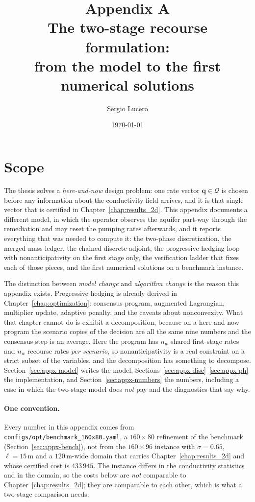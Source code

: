 \documentclass[11pt]{article}
\title{Appendix A\\
\large The two-stage recourse formulation:\\
from the model to the first numerical solutions}
\author{Sergio Lucero}
\date{\today}
\newcommand{\qq}{\mathbf{q}}
\newcommand{\calQ}{\mathcal{Q}}
\begin{document}
\maketitle

\section*{Scope}

The thesis solves a \emph{here-and-now} design problem: one rate vector
$\qq\in\calQ$ is chosen before any information about the conductivity field
arrives, and it is that single vector that is certified in
Chapter~\ref{chap:results_2d}. This appendix documents a different model, in
which the operator observes the aquifer part-way through the remediation and may
reset the pumping rates afterwards, and it reports everything that was needed to
compute it: the two-phase discretization, the merged mass ledger, the chained
discrete adjoint, the progressive hedging loop with nonanticipativity on the
first stage only, the verification ladder that fixes each of those pieces, and
the first numerical solutions on a benchmark instance.

The distinction between \emph{model change} and \emph{algorithm change} is the
reason this appendix exists. Progressive hedging is already derived in
Chapter~\ref{chap:optimization}: consensus program, augmented Lagrangian,
multiplier update, adaptive penalty, and the caveats about nonconvexity. What
that chapter cannot do is exhibit a decomposition, because on a here-and-now
program the scenario copies of the decision are all the same nine numbers and the
consensus step is an average. Here the program has $n_w$ shared first-stage rates
and $n_w$ recourse rates \emph{per scenario}, so nonanticipativity is a real
constraint on a strict subset of the variables, and the decomposition has
something to decompose. Section~\ref{sec:appx-model} writes the model,
Sections~\ref{sec:appx-disc}--\ref{sec:appx-ph} the implementation, and
Section~\ref{sec:appx-numbers} the numbers, including a case in which the
two-stage model does \emph{not} pay and the diagnostics that say why.

\paragraph{One convention.} Every number in this appendix comes from
\texttt{configs/opt/benchmark\_160x80.yaml}, a $160\times80$ refinement of the
benchmark (Section~\ref{sec:appx-bench}), not from the $160\times96$ instance
with $\sigma=0.65$, $\ell=15\,\mathrm{m}$ and a $120\,\mathrm{m}$-wide domain
that carries Chapter~\ref{chap:results_2d} and whose certified cost is
$433\,945$. The instance differs in the conductivity statistics and in the
domain, so the costs below are \emph{not} comparable to
Chapter~\ref{chap:results_2d}; they are comparable to each other, which is what a
two-stage comparison needs.
\end{document}
